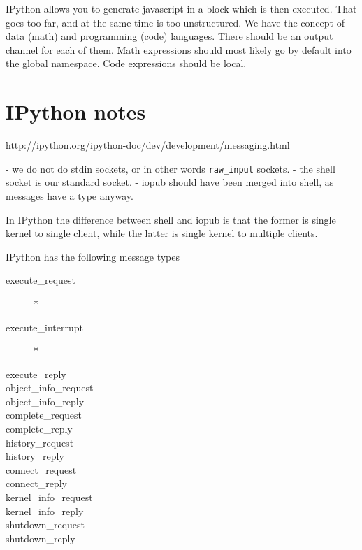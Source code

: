 IPython allows you to generate javascript in a block which is then
executed. That goes too far, and at the same time is too unstructured.
We have the concept of data (math) and programming (code)
languages. There should be an output channel for each of them. Math
expressions should most likely go by default into the global
namespace. Code expressions should be local. 


\section{IPython notes}

\url{http://ipython.org/ipython-doc/dev/development/messaging.html}

- we do not do stdin sockets, or in other words \verb|raw_input| sockets.
- the shell socket is our standard socket. 
- iopub should have been merged into shell, as messages have a type
  anyway. 

In IPython the difference between shell and iopub is that the former
is single kernel to single client, while the latter is single kernel
to multiple clients. 

IPython has the following message types
\begin{description}
\item[execute\_request] *
\item[execute\_interrupt] *
\item[execute\_reply] 
\item[object\_info\_request]
\item[object\_info\_reply]
\item[complete\_request]
\item[complete\_reply]
\item[history\_request]
\item[history\_reply]
\item[connect\_request]
\item[connect\_reply]
\item[kernel\_info\_request]
\item[kernel\_info\_reply]
\item[shutdown\_request]
\item[shutdown\_reply]
\end{description}


